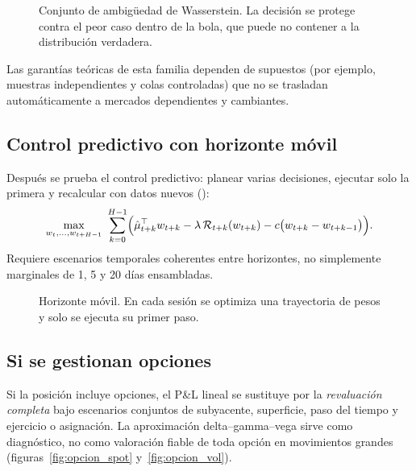 \begin{figure}[H]
\centering
\resizebox{0.86\linewidth}{!}{}
\caption{Conjunto de ambigüedad de Wasserstein. La decisión se protege contra el peor caso dentro de la
bola, que puede no contener a la distribución verdadera.}
\label{fig:ambiguedad}
\end{figure}

\begin{noconcluir}
Las garantías teóricas de esta familia dependen de supuestos (por ejemplo, muestras independientes y
colas controladas) que no se trasladan automáticamente a mercados dependientes y cambiantes.
\end{noconcluir}

\subsection{Control predictivo con horizonte móvil}\label{sec:mpc}

Después se prueba el control predictivo: planear varias decisiones, ejecutar solo la primera y recalcular
con datos nuevos \citep{boyd2017} ():
\begin{equation}
\max_{w_t,\dots,w_{t+H-1}}\ \sum_{k=0}^{H-1}\Bigl(\hat\mu_{t+k}^\top w_{t+k}-\lambda\,\mathcal{R}_{t+k}(w_{t+k})
-c\bigl(w_{t+k}-w_{t+k-1}\bigr)\Bigr).
\label{eq:mpc}
\end{equation}
Requiere escenarios temporales coherentes entre horizontes, no simplemente marginales de 1, 5 y 20 días
ensambladas.

\begin{figure}[H]
\centering
\resizebox{0.8\linewidth}{!}{}
\caption{Horizonte móvil. En cada sesión se optimiza una trayectoria de pesos y solo se ejecuta su primer
paso.}
\label{fig:mpc}
\end{figure}

\subsection{Si se gestionan opciones}\label{sec:opciones}

Si la posición incluye opciones, el P\&L lineal se sustituye por la \emph{revaluación completa} bajo
escenarios conjuntos de subyacente, superficie, paso del tiempo y ejercicio o asignación. La aproximación
delta--gamma--vega sirve como diagnóstico, no como valoración fiable de toda opción en movimientos grandes
(figuras~\ref{fig:opcion_spot} y~\ref{fig:opcion_vol}).


